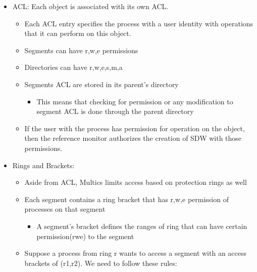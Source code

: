 \documentclass[
  12pt]{findlay}
\providecommand{\tightlist}{%
  \setlength{\itemsep}{0pt}\setlength{\parskip}{0pt}}
\begin{document}
\begin{itemize}
\tightlist
\item
  ACL: Each object is associated with its own ACL.

  \begin{itemize}
  \tightlist
  \item
    Each ACL entry specifies the process with a user identity with
    operations that it can perform on this object.
  \item
    Segments can have r,w,e permissions
  \item
    Directories can have r,w,e,s,m,a
  \item
    Segments ACL are stored in its parent's directory

    \begin{itemize}
    \tightlist
    \item
      This means that checking for permission or any modification to
      segment ACL is done through the parent directory
    \end{itemize}
  \item
    If the user with the process has permission for operation on the
    object, then the reference monitor authorizes the creation of SDW
    with those permissions.
  \end{itemize}
\item
  Rings and Brackets:

  \begin{itemize}
  \tightlist
  \item
    Aside from ACL, Multics limits access based on protection rings as
    well
  \item
    Each segment contains a ring bracket that has r,w,e permission of
    processes on that segment

    \begin{itemize}
    \tightlist
    \item
      A segment's bracket defines the ranges of ring that can have
      certain permission(rwe) to the segment
    \end{itemize}
  \item
    Suppose a process from ring r wants to access a segment with an
    access brackets of (r1,r2). We need to follow these rules:


\end{itemize}
\end{itemize}
\end{document}
